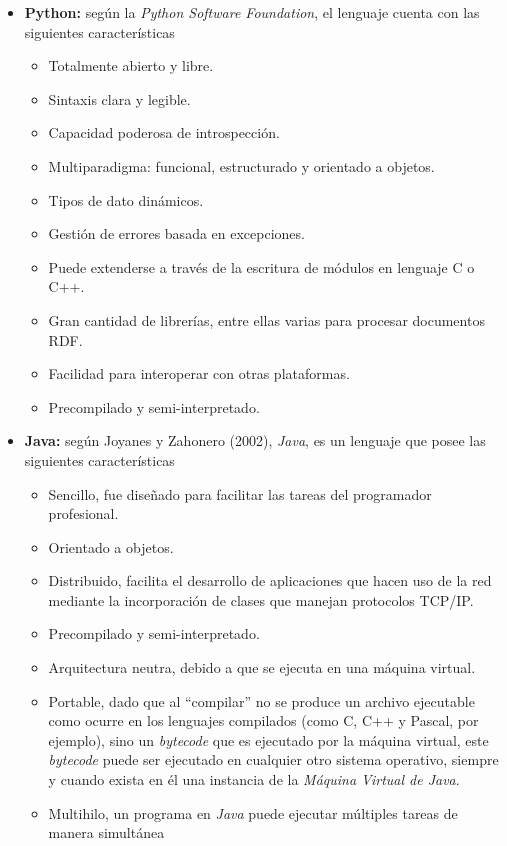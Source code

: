 \begin{itemize}
\item \textbf{Python:} según la \textit{Python Software Foundation}, el lenguaje cuenta con las siguientes características
    \begin{itemize}
    \item Totalmente abierto y libre.
    \item Sintaxis clara y legible.
    \item Capacidad poderosa de introspección.
    \item Multiparadigma: funcional, estructurado y orientado a objetos.
    \item Tipos de dato dinámicos.
    \item Gestión de errores basada en excepciones.
    \item Puede extenderse a través de la escritura de módulos en lenguaje C o C++.
    \item Gran cantidad de librerías, entre ellas varias para procesar documentos RDF.
    \item Facilidad para interoperar con otras plataformas.
    \item Precompilado y semi-interpretado.
    \end{itemize}

\item \textbf{Java:} según Joyanes y Zahonero (2002), \textit{Java}, es un lenguaje que posee las siguientes características
    \begin{itemize}
    \item Sencillo, fue diseñado para facilitar las tareas del programador profesional.
    \item Orientado a objetos.
    \item Distribuido, facilita el desarrollo de aplicaciones que hacen uso de la red mediante la incorporación de clases que manejan protocolos TCP/IP.
    \item Precompilado y semi-interpretado.
    \item Arquitectura neutra, debido a que se ejecuta en una máquina virtual.
    \item Portable, dado que al ``compilar'' no se produce un archivo ejecutable como ocurre en los lenguajes compilados (como C, C++ y Pascal, por ejemplo), sino un \textit{bytecode} que es ejecutado por la máquina virtual, este \textit{bytecode} puede ser ejecutado en cualquier otro sistema operativo, siempre y cuando exista en él una instancia de la \textit{Máquina Virtual de Java}.
    \item Multihilo, un programa en \textit{Java} puede ejecutar múltiples tareas de manera simultánea
    \end{itemize}
\end{itemize}

